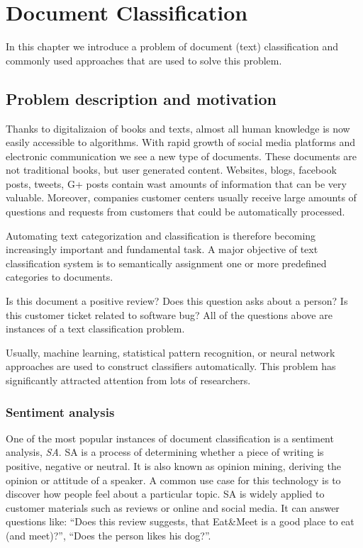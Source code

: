 \chapter{Document Classification}

    In this chapter we introduce a problem of document (text) classification and commonly used approaches that are used to solve this problem.

\section{Problem description and motivation} \label{sec:problem}

    Thanks to digitalizaion of books and texts, almost all human knowledge is now easily accessible to algorithms. 
    With rapid growth of social media platforms and electronic communication we see a new type of documents.
    These documents are not traditional books, but user generated content.
    Websites, blogs, facebook posts, tweets, G+ posts contain wast amounts of information that can be very valuable.
    Moreover, companies customer centers usually receive large amounts of questions and requests from customers that could be automatically processed.
    
    Automating text categorization and classification is therefore becoming increasingly important and fundamental task. 
    A major objective of text classification system is to semantically assignment one or more predefined categories to documents.
    
    Is this document a positive review? 
    Does this question asks about a person?
    Is this customer ticket related to software bug?
    All of the questions above are instances of a text classification problem.
    
    Usually, machine learning, statistical pattern recognition, or neural network approaches are used to construct classifiers automatically.
    This problem has significantly attracted attention from lots of researchers.

    \subsection{Sentiment analysis}
    
    
    One of the most popular instances of document classification is a sentiment analysis, \emph{SA}.
    SA is a process of determining whether a piece of writing is positive, negative or neutral.
    It is also known as opinion mining, deriving the opinion or attitude of a speaker. 
    A common use case for this technology is to discover how people feel about a particular topic.
    SA is widely applied to customer materials such as reviews or online and social media.
    It can answer questions like: ``Does this review suggests, that Eat\&Meet is a good place to eat (and meet)?'', ``Does the person likes his dog?''.
    
